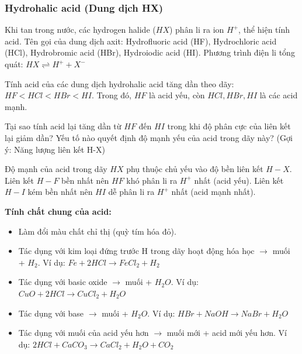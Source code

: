 \documentclass[Main.tex]{subfiles}
\begin{document}
\subsubsection{Hydrohalic acid (Dung dịch HX)}
	\begin{ghinho}
		Khi tan trong nước, các hydrogen halide ($HX$) phân li ra ion $H^+$, thể hiện tính acid. Tên gọi của dung dịch axit: Hydrofluoric acid (HF), Hydrochloric acid (HCl), Hydrobromic acid (HBr), Hydroiodic acid (HI).
		Phương trình điện li tổng quát: $HX \rightleftharpoons H^+ + X^-$
	\end{ghinho}
	\begin{tomtat}
		Tính acid của các dung dịch hydrohalic acid tăng dần theo dãy: $HF < HCl < HBr < HI$.
        Trong đó, $HF$ là acid yếu, còn $HCl, HBr, HI$ là các acid mạnh.
	\end{tomtat}
	\begin{hoivadap}
		Tại sao tính acid lại tăng dần từ $HF$ đến $HI$ trong khi độ phân cực của liên kết lại giảm dần? Yếu tố nào quyết định độ mạnh yếu của acid trong dãy này? (Gợi ý: Năng lượng liên kết H-X)
	\end{hoivadap}
    \begin{ghinho}
        Độ mạnh của acid trong dãy $HX$ phụ thuộc chủ yếu vào độ bền liên kết $H-X$. Liên kết $H-F$ bền nhất nên $HF$ khó phân li ra $H^+$ nhất (acid yếu). Liên kết $H-I$ kém bền nhất nên $HI$ dễ phân li ra $H^+$ nhất (acid mạnh nhất).
    \end{ghinho}
    \begin{hopdongian}
        \textbf{Tính chất chung của acid:}
        \begin{itemize}
            \item Làm đổi màu chất chỉ thị (quỳ tím hóa đỏ).
            \item Tác dụng với kim loại đứng trước H trong dãy hoạt động hóa học $\rightarrow$ muối + $H_2$. Ví dụ: $Fe + 2HCl \rightarrow FeCl_2 + H_2$
            \item Tác dụng với basic oxide $\rightarrow$ muối + $H_2O$. Ví dụ: $CuO + 2HCl \rightarrow CuCl_2 + H_2O$
            \item Tác dụng với base $\rightarrow$ muối + $H_2O$. Ví dụ: $HBr + NaOH \rightarrow NaBr + H_2O$
            \item Tác dụng với muối của acid yếu hơn $\rightarrow$ muối mới + acid mới yếu hơn. Ví dụ: $2HCl + CaCO_3 \rightarrow CaCl_2 + H_2O + CO_2$
        \end{itemize}
    \end{hopdongian}
\end{document}
